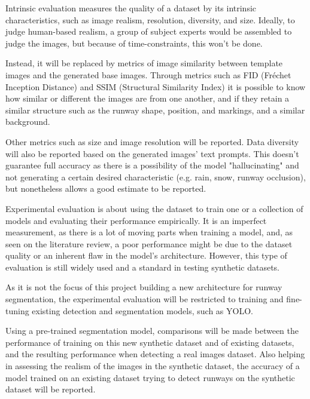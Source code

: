 Intrinsic evaluation measures the quality of a dataset by its intrinsic characteristics, such as image realism, resolution, diversity, and size. Ideally, to judge human-based realism, a group of subject experts would be assembled to judge the images, but because of time-constraints, this won't be done.

Instead, it will be replaced by metrics of image similarity between template images and the generated base images. Through metrics such as FID (Fréchet Inception Distance) and SSIM (Structural Similarity Index) it is possible to know how similar or different the images are from one another, and if they retain a similar structure such as the runway shape, position, and markings, and a similar background.

Other metrics such as size and image resolution will be reported. Data diversity will also be reported based on the generated images' text prompts. This doesn't guarantee full accuracy as there is a possibility of the model "hallucinating" and not generating a certain desired characteristic (e.g. rain, snow, runway occlusion), but nonetheless allows a good estimate to be reported.

Experimental evaluation is about using the dataset to train one or a collection of models and evaluating their performance empirically. It is an imperfect measurement, as there is a lot of moving parts when training a model, and, as seen on the literature review, a poor performance might be due to the dataset quality or an inherent flaw in the model's architecture. However, this type of evaluation is still widely used and a standard in testing synthetic datasets.

As it is not the focus of this project building a new architecture for runway segmentation, the experimental evaluation will be restricted to training and fine-tuning existing detection and segmentation models, such as YOLO.

Using a pre-trained segmentation model, comparisons will be made between the performance of training on this new synthetic dataset and of existing datasets, and the resulting performance when detecting a real images dataset. Also helping in assessing the realism of the images in the synthetic dataset, the accuracy of a model trained on an existing dataset trying to detect runways on the synthetic dataset will be reported.
